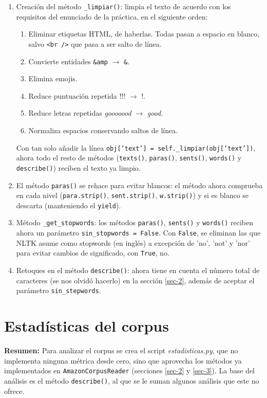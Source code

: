 \documentclass[10pt,a4paper]{article}
\begin{document}
\begin{enumerate}
    \item Creación del método \texttt{\_limpiar()}: limpia el texto de acuerdo con los requisitos del enunciado de la práctica, en 
    el siguiente orden: \begin{enumerate}
        \item Eliminar etiquetas HTML, de haberlas. Todas pasan a espacio en blanco, salvo \texttt{<br />} que pasa a ser salto de 
        línea. 
        \item Convierte entidades \texttt{\&amp} $\to$ \texttt{\&}. 
        \item Elimina emojis. 
        \item Reduce puntuación repetida !!! $\to$ !. 
        \item Reduce letras repetidas \textit{gooooood} $\to$ \textit{good}. 
        \item Normaliza espacios conservando saltos de línea. 
    \end{enumerate}
    Con tan solo añadir la línea \texttt{obj['text'] = self.\_limpiar(obj['text'])}, ahora todo el resto de métodos 
    (\texttt{texts()}, \texttt{paras()}, \texttt{sents()}, \texttt{words()} y \texttt{describe()}) reciben el texto ya limpio. 
    \item El método \texttt{paras()} se rehace para evitar blancos: el método ahora comprueba en cada nivel 
    (\texttt{para.strip()}, \texttt{sent.strip()}, \texttt{w.strip()}) y si es blanco se descarta (manteniendo el \texttt{yield}).
    \item Método \texttt{\_get\_stopwords}: los métodos \texttt{paras()}, \texttt{sents()} y \texttt{words()} reciben ahora
    un parámetro \texttt{sin\_stopwords = False}. Con \texttt{False}, se eliminan las que NLTK asume como stopwords (en inglés) 
    a excepción de 'no', 'not' y 'nor' para evitar cambios de significado, con \texttt{True}, no. 
    \item Retoques en el método \texttt{describe()}: ahora tiene en cuenta el número total de caracteres (se nos olvidó hacerlo)
    en la sección \ref{sec-2}, además de aceptar el parámetro \texttt{sin\_stepwords}. 
\end{enumerate}

\section{Estadísticas del corpus}
\label{sec-4}

\noindent \textbf{Resumen:} Para analizar el corpus se crea el script \textit{estadisticas.py}, que no implementa
ninguna métrica desde cero, sino que aprovecha los métodos ya implementados en \texttt{AmazonCorpusReader}
(secciones \ref{sec-2} y \ref{sec-3}). La base del análisis es el método \texttt{describe()}, al que se le suman
algunos análisis que este no ofrece.
\end{document}
